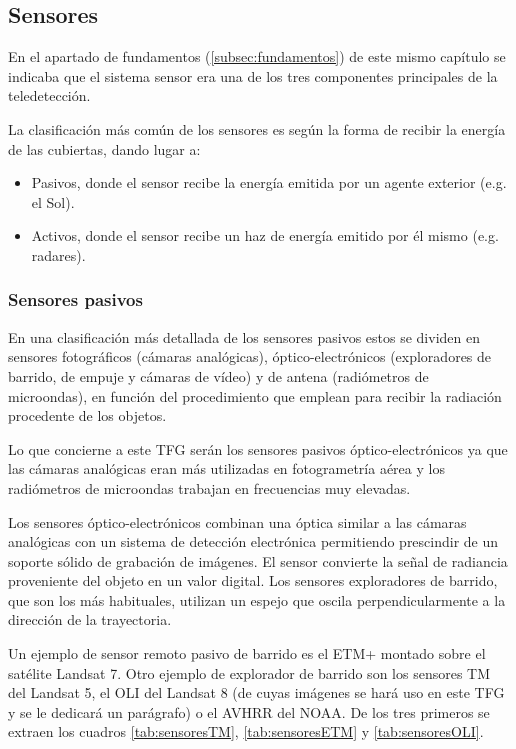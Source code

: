 \subsection{Sensores}
\label{subsec:sensores}
En el apartado de fundamentos (\ref{subsec:fundamentos}) de este mismo capítulo se indicaba que el sistema sensor era una de los tres componentes principales de la teledetección.%

La clasificación más común de los sensores es según la forma de recibir la energía de las cubiertas, dando lugar a:
\begin{itemize}
	\item Pasivos, donde el sensor recibe la energía emitida por un agente exterior (e.g. el Sol).
	\item Activos, donde el sensor recibe un haz de energía emitido por él mismo (e.g. radares).
\end{itemize}

\subsubsection{Sensores pasivos} \label{subsubsec:sensorespasivos}
En una clasificación más detallada de los sensores pasivos estos se dividen en sensores fotográficos (cámaras analógicas), óptico-electrónicos (exploradores de barrido, de empuje y cámaras de vídeo) y de antena (radiómetros de microondas), en función del procedimiento que emplean para recibir la radiación procedente de los objetos.%

Lo que concierne a este \ac{TFG} serán los sensores pasivos óptico-electrónicos ya que las cámaras analógicas eran más utilizadas en fotogrametría aérea y los radiómetros de microondas trabajan en frecuencias muy elevadas.%

Los sensores óptico-electrónicos combinan una óptica similar a las cámaras analógicas con un sistema de detección electrónica permitiendo prescindir de un soporte sólido de grabación de imágenes. El sensor convierte la señal de radiancia proveniente del objeto en un valor digital. Los sensores exploradores de barrido, que son los más habituales, utilizan un espejo que oscila perpendicularmente a la dirección de la trayectoria.%

Un ejemplo de sensor remoto pasivo de barrido es el \ac{ETM+} montado sobre el satélite Landsat 7. Otro ejemplo de explorador de barrido son los sensores \ac{TM} del Landsat 5, el \ac{OLI} del Landsat 8 (de cuyas imágenes se hará uso en este \ac{TFG} y se le dedicará un parágrafo) o el \ac{AVHRR} del NOAA. De los tres primeros se extraen los cuadros \ref{tab:sensoresTM}, \ref{tab:sensoresETM} y \ref{tab:sensoresOLI}.%

